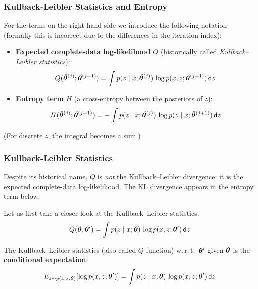  
  \subsubsection{Kullback-Leibler Statistics and Entropy}
  
  For the terms on the right hand side we introduce the following notation (formally this is incorrect due to the differences in the iteration index):
  
  \begin{itemize}
    \item   \textbf{Expected complete-data log-likelihood} $Q$ (historically called \emph{Kullback--Leibler statistics}):
      \begin{displaymath}
        Q(\hat{\bm{\theta}}^{(j)};\hat{\bm{\theta}}^{(j+1)}) =
        \int p(z\mid x; \hat{\bm{\theta}}^{(j)}) \, \log p(x, z;\hat{\bm{\theta}}^{(j+1)}) \, \mathsf{d}z
      \end{displaymath}
   \item   \textbf{Entropy term} $H$ (a cross-entropy between the posteriors of $z$):
     \begin{displaymath}
       H(\hat{\bm{\theta}}^{(j)};\hat{\bm{\theta}}^{(j+1)}) = 
       - \int p(z\mid x; \hat{\bm{\theta}}^{(j)}) \, \log p(z\mid x; \hat{\bm{\theta}}^{(j+1)})\, \mathsf{d}z
      \end{displaymath}
  \end{itemize}
  {\small (For discrete $z$, the integral becomes a sum.)}
     
  \subsubsection{Kullback-Leibler Statistics}\label{sec:em_monotonicity}

Despite its historical name, $Q$ is \emph{not} the Kullback--Leibler divergence: it is the expected complete-data log-likelihood. The KL divergence appears in the entropy term below. 

  Let us first take a closer look at the Kullback--Leibler statistics:
  \begin{displaymath}
    Q(\bm{\theta},\bm{\theta}') = \int p(z\mid x; \bm{\theta})\, \log p(x,z;\bm{\theta}')\, \mathsf{d}z
  \end{displaymath}

  The Kullback--Leibler statistics (also called $Q$-function) w.\,r.\,t.\ $\bm{\theta}'$ given $\bm{\theta}$ is the \textbf{conditional expectation}:
  \begin{displaymath}
    E_{z\sim p(z\mid x;\bm{\theta})}[\log p(x,z;\bm{\theta}')] = 
    \int p(z\mid x; \bm{\theta})\, \log p(x,z;\bm{\theta}')\, \mathsf{d}z
  \end{displaymath}
     
